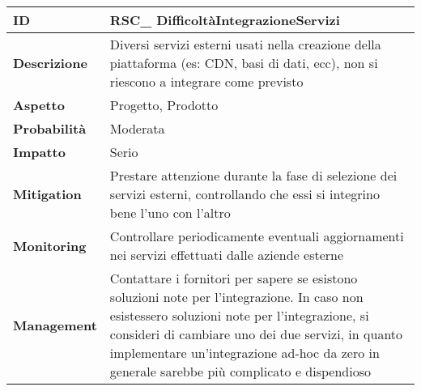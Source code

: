 \begin{tabular}{|p{2.2cm}|p{9.6cm}| } 
 	\hline
	 \textbf{ID} & RSC\_ DifficoltàIntegrazioneServizi\\ [0.5ex] 
	\hline
	\textbf{Descrizione} & Diversi servizi esterni usati nella creazione della piattaforma (es: CDN, basi di dati, ecc), non si riescono a integrare come previsto\\ 
	\hline
	\textbf{Aspetto} &  Progetto, Prodotto\\ 
	\hline
	\textbf{Probabilità} &  Moderata\\ 
	\hline
	\textbf{Impatto} &  Serio\\ 
	\hline
	\textbf{Mitigation} & Prestare attenzione durante la fase di selezione dei servizi esterni, controllando che essi si integrino bene l'uno con l'altro\\ 
	\hline
	\textbf{Monitoring} & Controllare periodicamente eventuali aggiornamenti nei servizi effettuati dalle aziende esterne\\ 
	\hline
	\textbf{Management} & Contattare i fornitori per sapere se esistono soluzioni note per l'integrazione. In caso non esistessero soluzioni note per l'integrazione, si consideri di cambiare uno dei due servizi, in quanto implementare un'integrazione ad-hoc da zero in generale sarebbe più complicato e dispendioso\\ 
	\hline
\end{tabular}

